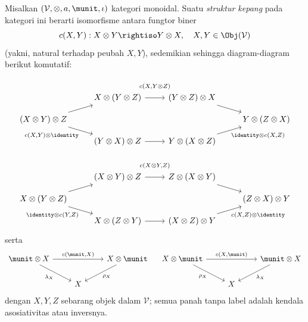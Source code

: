 \begin{definition}\label{def:braiding}
	Misalkan $(\mathcal{V}, \otimes, a, \munit, \iota)$ kategori monoidal. Suatu \emph{struktur kepang} pada kategori ini berarti isomorfisme antara fungtor biner
	\[ c(X,Y): X \otimes Y \rightiso Y \otimes X, \quad X, Y \in \Obj(\mathcal{V}) \]
	(yakni, natural terhadap peubah $X, Y$), sedemikian sehingga diagram-diagram berikut komutatif:
	\begin{equation}\label{eqn:hexagon-axiom-1}\begin{tikzcd}[row sep=small]
		{} & X \otimes (Y \otimes Z) \arrow[r, "{c(X, Y \otimes Z)}" inner sep=1em] & (Y \otimes Z) \otimes X \arrow[rd] & \\
		(X \otimes Y) \otimes Z \arrow[ru] \arrow[rd, "{c(X,Y) \otimes \identity}"'] & & & Y \otimes (Z \otimes X) \\
		& (Y \otimes X) \otimes Z \arrow[r] & Y \otimes (X \otimes Z) \arrow[ru, "{\identity \otimes c(X,Z)}"'] &
	\end{tikzcd}\end{equation}
	\begin{equation}\label{eqn:hexagon-axiom-2}\begin{tikzcd}[row sep=small]
		{} & (X \otimes Y) \otimes Z \arrow[r, "{c(X \otimes Y, Z)}" inner sep=1em] & Z \otimes (X \otimes Y) \arrow[rd] & \\
		X \otimes (Y \otimes Z) \arrow[ru] \arrow[rd, "{\identity \otimes c(Y, Z)}"'] & & & (Z \otimes X) \otimes Y \\
		& X \otimes (Z \otimes Y) \arrow[r] & (X \otimes Z) \otimes Y \arrow[ru, "{c(X, Z) \otimes \identity}"'] &
	\end{tikzcd}\end{equation}
	serta
	\begin{equation}\begin{tikzcd}
		\munit \otimes X \arrow[rd, "\lambda_X"'] \arrow[rr, "{c(\munit, X)}"] & & X \otimes \munit \arrow[ld, "\rho_X"] \\
		& X &
	\end{tikzcd} \quad \begin{tikzcd}
		X \otimes \munit \arrow[rd, "\rho_X"'] \arrow[rr, "{c(X, \munit)}"] & & \munit  \otimes X \arrow[ld, "\lambda_X"] \\
		& X &
	\end{tikzcd}\end{equation}
	dengan $X,Y,Z$ sebarang objek dalam $\mathcal{V}$; semua panah tanpa label adalah kendala asosiativitas atau inversnya.
\end{definition}


